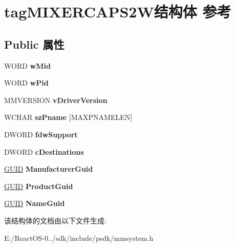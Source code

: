 \hypertarget{structtag_m_i_x_e_r_c_a_p_s2_w}{}\section{tag\+M\+I\+X\+E\+R\+C\+A\+P\+S2\+W结构体 参考}
\label{structtag_m_i_x_e_r_c_a_p_s2_w}
\subsection*{Public 属性}
\begin{DoxyCompactItemize}
\item 
\mbox{\label{structtag_m_i_x_e_r_c_a_p_s2_w_ab7044e8d27872f86c8da65c5b750384d}} 
W\+O\+RD {\bfseries w\+Mid}
\item 
\mbox{\label{structtag_m_i_x_e_r_c_a_p_s2_w_ab2d4f96d4c74116143f2e4ccf04df69f}} 
W\+O\+RD {\bfseries w\+Pid}
\item 
\mbox{\label{structtag_m_i_x_e_r_c_a_p_s2_w_a6d23d261f4b65c54f445ce289d076a5e}} 
M\+M\+V\+E\+R\+S\+I\+ON {\bfseries v\+Driver\+Version}
\item 
\mbox{\label{structtag_m_i_x_e_r_c_a_p_s2_w_a5e33de9fa69661bf53ebaa10921fb9cc}} 
W\+C\+H\+AR {\bfseries sz\+Pname} \mbox{[}M\+A\+X\+P\+N\+A\+M\+E\+L\+EN\mbox{]}
\item 
\mbox{\label{structtag_m_i_x_e_r_c_a_p_s2_w_a57da2194038ddff22a61b363719833d7}} 
D\+W\+O\+RD {\bfseries fdw\+Support}
\item 
\mbox{\label{structtag_m_i_x_e_r_c_a_p_s2_w_a88d35263bc30dea77bdadade5260f468}} 
D\+W\+O\+RD {\bfseries c\+Destinations}
\item 
\mbox{\label{structtag_m_i_x_e_r_c_a_p_s2_w_a6e9983a406c45dd8642f65361b92c639}} 
\hyperlink{interface_g_u_i_d}{G\+U\+ID} {\bfseries Manufacturer\+Guid}
\item 
\mbox{\label{structtag_m_i_x_e_r_c_a_p_s2_w_a5b9c3a2c03b998495617ab002852f77b}} 
\hyperlink{interface_g_u_i_d}{G\+U\+ID} {\bfseries Product\+Guid}
\item 
\mbox{\label{structtag_m_i_x_e_r_c_a_p_s2_w_a88d82ddf7e324f313e6d55d418db1639}} 
\hyperlink{interface_g_u_i_d}{G\+U\+ID} {\bfseries Name\+Guid}
\end{DoxyCompactItemize}


该结构体的文档由以下文件生成\+:\begin{DoxyCompactItemize}
\item 
E\+:/\+React\+O\+S-\/0../sdk/include/psdk/mmsystem.\+h\end{DoxyCompactItemize}
